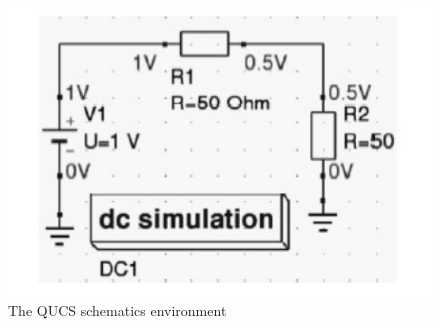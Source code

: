 \documentclass{report}
\begin{document}
	\begin{figure}[t]
		\includegraphics{Figures/Fig}
		\caption{The QUCS schematics environment}
		\label{fig:figure2}
	\end{figure}
\end{document}
